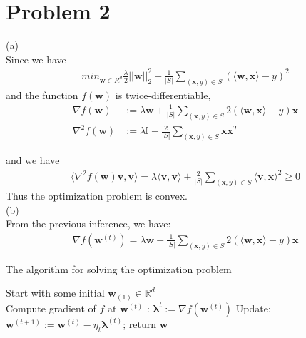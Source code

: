 \documentclass[twoside,11pt]{homework}
\begin{document}
\section*{Problem 2}
(a) \indent \\

Since we have
\begin{align*}
min_{\pmb w \in R^d} \frac{\lambda}{2}||\pmb w||_2^2 + \frac{1}{|S|}\sum_{(\pmb x, y) \in S}(\langle \pmb w, \pmb x \rangle - y)^2
\end{align*}
and the function $f(\pmb w) $ is twice-differentiable, 
\begin{align*}
\nabla f(\pmb w) & := \lambda\pmb w + \frac{1}{|S|}\sum_{(\pmb x, y) \in S}2(\langle \pmb w, \pmb x \rangle - y)\pmb x \\
\nabla^2 f(\pmb w) & := \lambda\mathbb{I} + \frac{2}{|S|}\sum_{(\pmb x, y) \in S} \pmb x \pmb x^T
\end{align*}

and we have
\begin{align*}
\langle \nabla^2 f(\pmb w)\pmb v, \pmb v  \rangle = \lambda\langle \pmb v, \pmb v\rangle + \frac {2}{|S|}\sum_{(\pmb x, y) \in S}\langle \pmb v, \pmb x \rangle ^ 2 \geq 0
\end{align*}
Thus the optimization problem is convex.\\

(b) \\ \indent
From the previous inference, we have: 
\begin{align*}
\nabla f(\pmb w ^ {(t)}) = \lambda\pmb w + \frac{1}{|S|}\sum_{(\pmb x, y) \in S}2(\langle \pmb w, \pmb x \rangle - y)\pmb x
\end{align*}
\begin{algorithm}
\caption{The algorithm for solving the optimization problem}
\begin{algorithmic} 
\STATE Start with some initial $\pmb w_{(1)} \in \mathbb{R}^d$ \\
\STATE Compute gradient of $f$ at $\pmb w^{(t)}$ :
\indent
	\STATE \hspace{\algorithmicindent}$\pmb\lambda^{t} := \nabla f(\pmb w ^ {(t)})$ 
\STATE Update: 
\indent
	\STATE \hspace{\algorithmicindent}$\pmb w^{(t+1)} := \pmb w^{(t)} - \eta_t\pmb\lambda^{(t)}$;
\ENDFOR
\STATE return $\pmb w$
\end{algorithmic}
\end{algorithm}
\end{document}
